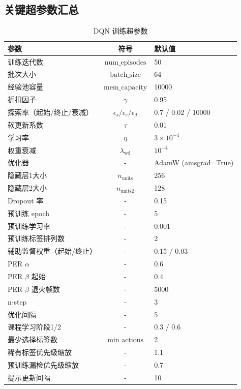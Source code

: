 \documentclass[12pt,a4paper]{article}
\begin{document}
\subsection{关键超参数汇总}

\begin{table}[H]
\centering
\caption{DQN 训练超参数}
\begin{tabular}{lcl}
\toprule
\textbf{参数} & \textbf{符号} & \textbf{默认值} \\
\midrule
训练迭代数 & $\text{num\_episodes}$ & 50 \\
批次大小 & $\text{batch\_size}$ & 64 \\
经验池容量 & $\text{mem\_capacity}$ & 10000 \\
折扣因子 & $\gamma$ & 0.95 \\
探索率（起始/终止/衰减） & $\epsilon_s / \epsilon_e / \epsilon_d$ & 0.7 / 0.02 / 10000 \\
软更新系数 & $\tau$ & 0.01 \\
学习率 & $\eta$ & $3 \times 10^{-4}$ \\
权重衰减 & $\lambda_{\text{wd}}$ & $10^{-4}$ \\
优化器 & - & AdamW (amsgrad=True) \\
隐藏层1大小 & $n_{\text{units}}$ & 256 \\
隐藏层2大小 & $n_{\text{units2}}$ & 128 \\
Dropout 率 & - & 0.15 \\
预训练 epoch & - & 5 \\
预训练学习率 & - & 0.001 \\
预训练标签排列数 & - & 2 \\
辅助监督权重（起始/终止） & - & 0.15 / 0.03 \\
PER $\alpha$ & - & 0.6 \\
PER $\beta$ 起始 & - & 0.4 \\
PER $\beta$ 退火帧数 & - & 5000 \\
n-step & - & 3 \\
优化间隔 & - & 5 \\
课程学习阶段1/2 & - & 0.3 / 0.6 \\
最少选择标签数 & $\text{min\_actions}$ & 2 \\
稀有标签优先级缩放 & - & 1.1 \\
预训练漏检优先级缩放 & - & 0.7 \\
提示更新间隔 & - & 10 \\
\bottomrule
\end{tabular}
\end{table}
\end{document}
